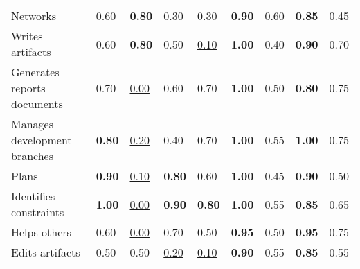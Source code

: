 \begin{tabular}{lllllllll}
Networks & 0.60 & \textbf{0.80} & 0.30 & 0.30 & \textbf{0.90} & 0.60 & \textbf{0.85} & 0.45 \\
Writes artifacts & 0.60 & \textbf{0.80} & 0.50 & \underline{0.10} & \textbf{1.00} & 0.40 & \textbf{0.90} & 0.70 \\
Generates reports documents & 0.70 & \underline{0.00} & 0.60 & 0.70 & \textbf{1.00} & 0.50 & \textbf{0.80} & 0.75 \\
Manages development branches & \textbf{0.80} & \underline{0.20} & 0.40 & 0.70 & \textbf{1.00} & 0.55 & \textbf{1.00} & 0.75 \\
Plans & \textbf{0.90} & \underline{0.10} & \textbf{0.80} & 0.60 & \textbf{1.00} & 0.45 & \textbf{0.90} & 0.50 \\
Identifies constraints & \textbf{1.00} & \underline{0.00} & \textbf{0.90} & \textbf{0.80} & \textbf{1.00} & 0.55 & \textbf{0.85} & 0.65 \\
Helps others & 0.60 & \underline{0.00} & 0.70 & 0.50 & \textbf{0.95} & 0.50 & \textbf{0.95} & 0.75 \\
Edits artifacts & 0.50 & 0.50 & \underline{0.20} & \underline{0.10} & \textbf{0.90} & 0.55 & \textbf{0.85} & 0.55 \\
\bottomrule
\end{tabular}
